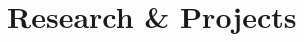 \documentclass[letterpaper]{twentysecondcv} %
\begin{document}
\begin{twenty}
        
    
    
\end{twenty}

\section{Research \& Projects}
\end{document}
